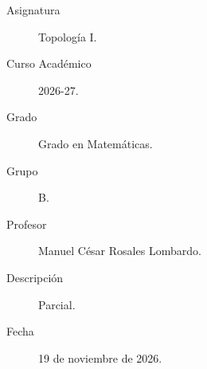 \documentclass[12pt]{article}
\begin{document}

    
    

    \begin{description}
        \item[Asignatura] Topología I.
        \item[Curso Académico] 2026-27.
        \item[Grado] Grado en Matemáticas.
        \item[Grupo] B.
        \item[Profesor] Manuel César Rosales Lombardo.
        \item[Descripción] Parcial.
        \item[Fecha] 19 de noviembre de 2026.
    
    \end{description}
    \newpage
\end{document}
